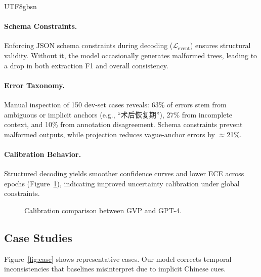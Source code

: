 \documentclass[11pt]{article}
\begin{document}
\begin{CJK*}{UTF8}{gbsn}
\paragraph{Schema Constraints.}
Enforcing JSON schema constraints during decoding ($\mathcal{L}_{\text{event}}$) ensures structural validity. Without it, the model occasionally generates malformed trees, leading to a drop in both extraction F1 and overall consistency.

\paragraph{Error Taxonomy.}
Manual inspection of 150 dev-set cases reveals: 63\% of errors stem from ambiguous or implicit anchors (e.g., ``术后恢复期''), 27\% from incomplete context, and 10\% from annotation disagreement. Schema constraints prevent malformed outputs, while projection reduces vague-anchor errors by $\approx$21\%.

\paragraph{Calibration Behavior.}
Structured decoding yields smoother confidence curves and lower ECE across epochs (Figure~\ref{fig:ece_curve}), indicating improved uncertainty calibration under global constraints.

\begin{figure}[t]
\centering
{}
\caption{Calibration comparison between GVP and GPT-4.}
\label{fig:ece_curve}
\vspace{-0.5em}
\end{figure}

\subsection{Case Studies}
\label{sec:case}
Figure~\ref{fig:case} shows representative cases. Our model corrects temporal inconsistencies that baselines misinterpret due to implicit Chinese cues.


\end{CJK*}
\end{document}
